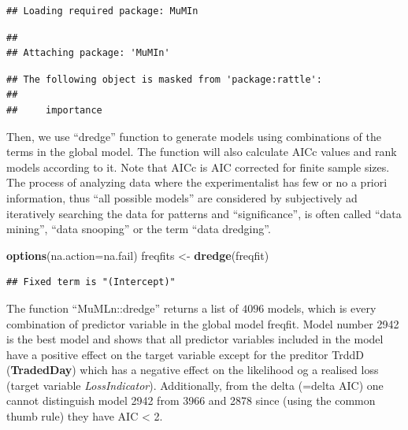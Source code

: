 \documentclass[]{article}
\newenvironment{Shaded}{\begin{snugshade}}{\end{snugshade}}
\newcommand{\KeywordTok}[1]{\textcolor[rgb]{0.13,0.29,0.53}{\textbf{#1}}}
\newcommand{\DataTypeTok}[1]{\textcolor[rgb]{0.13,0.29,0.53}{#1}}
\newcommand{\StringTok}[1]{\textcolor[rgb]{0.31,0.60,0.02}{#1}}
\newcommand{\NormalTok}[1]{#1}
\begin{document}
\begin{verbatim}
## Loading required package: MuMIn
\end{verbatim}

\begin{verbatim}
## 
## Attaching package: 'MuMIn'
\end{verbatim}

\begin{verbatim}
## The following object is masked from 'package:rattle':
## 
##     importance
\end{verbatim}

\doublespacing

Then, we use ``dredge'' function to generate models using combinations
of the terms in the global model. The function will also calculate AICc
values and rank models according to it. Note that AICc is AIC corrected
for finite sample sizes. The process of analyzing data where the
experimentalist has few or no a priori information, thus ``all possible
models'' are considered by subjectively ad iteratively searching the
data for patterns and ``significance'', is often called ``data mining'',
``data snooping'' or the term ``data dredging''.

\singlespacing

\begin{Shaded}
\begin{Highlighting}[]
\KeywordTok{options}\NormalTok{(}\DataTypeTok{na.action=}\NormalTok{na.fail)}
\NormalTok{freqfits <-}\StringTok{ }\KeywordTok{dredge}\NormalTok{(freqfit)}
\end{Highlighting}
\end{Shaded}

\begin{verbatim}
## Fixed term is "(Intercept)"
\end{verbatim}

\doublespacing

The function ``MuMLn::dredge'' returns a list of \(4096\) models, which
is every combination of predictor variable in the global model freqfit.
Model number 2942 is the best model and shows that all predictor
variables included in the model have a positive effect on the target
variable except for the preditor TrddD (\textbf{TradedDay}) which has a
negative effect on the likelihood og a realised loss (target variable
\emph{LossIndicator}). Additionally, from the delta (=delta AIC) one
cannot distinguish model 2942 from 3966 and 2878 since (using the common
thumb rule) they have AIC \textless{} 2.\medskip
\end{document}

